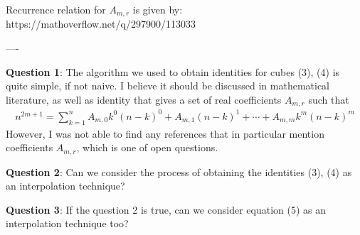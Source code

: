 Recurrence relation for $A_{m,r}$ is given by: https://mathoverflow.net/q/297900/113033

----

\textbf{Question 1}: The algorithm we used to obtain identities for
cubes (3), (4) is quite simple, if not naive.
I believe it should be discussed in mathematical literature, as well as identity
that gives a set of real coefficients $A_{m,r}$ such that
\begin{align*}
    n^{2m+1} = \sum_{k=1}^{n} A_{m,0} k^0 (n-k)^0 + A_{m,1} (n-k)^1
    + \cdots + A_{m,m} k^m (n-k)^m
\end{align*}
However, I was not able to find any references that in particular mention coefficients $A_{m,r}$,
which is one of open questions.


\textbf{Question 2}: Can we consider the process of obtaining the identities (3), (4) as an interpolation technique?

\textbf{Question 3}: If the question 2 is true, can we consider equation (5) as an interpolation technique too?

